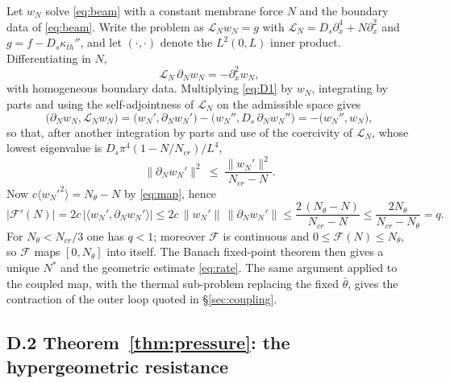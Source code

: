 \documentclass[11pt,a4paper]{article}
\begin{document}
Let $w_N$ solve \eqref{eq:beam} with a constant membrane force $N$ and the boundary data of
\eqref{eq:beam}. Write the problem as $\mathcal L_Nw_N=g$ with
$\mathcal L_N=D_s\partial_x^4+N\partial_x^2$ and $g=f-D_s\kappa_{th}''$, and let
$(\cdot,\cdot)$ denote the $L^2(0,L)$ inner product. Differentiating in $N$,
\begin{equation}
\mathcal L_N\,\partial_Nw_N=-\partial_x^2w_N ,
\label{eq:D1}
\end{equation}
with homogeneous boundary data. Multiplying \eqref{eq:D1} by $w_N$, integrating by parts and
using the self-adjointness of $\mathcal L_N$ on the admissible space gives
\begin{equation}
\bigl(\partial_Nw_N,\mathcal L_Nw_N\bigr)
=\bigl(w_N',\partial_Nw_N'\bigr)-\bigl(w_N'',D_s\,\partial_Nw_N''\bigr)
=-\bigl(w_N'',w_N\bigr),
\label{eq:D2}
\end{equation}
so that, after another integration by parts and use of the coercivity of $\mathcal L_N$,
whose lowest eigenvalue is $D_s\pi^4(1-N/N_{cr})/L^4$,
\begin{equation}
\bigl\|\partial_Nw_N'\bigr\|^2\ \le\ \frac{\|w_N'\|^2}{N_{cr}-N}.
\label{eq:D3}
\end{equation}
Now $c\langle w_N'^2\rangle=N_\theta-N$ by \eqref{eq:map}, hence
\begin{equation}
\bigl|\mathcal F'(N)\bigr|
=2c\,\bigl|\langle w_N',\partial_Nw_N'\rangle\bigr|
\le2c\,\|w_N'\|\,\|\partial_Nw_N'\|
\le\frac{2\,(N_\theta-N)}{N_{cr}-N}
\le\frac{2N_\theta}{N_{cr}-N_\theta}=q .
\label{eq:D4}
\end{equation}
For $N_\theta<N_{cr}/3$ one has $q<1$; moreover $\mathcal F$ is continuous and
$0\le\mathcal F(N)\le N_\theta$, so $\mathcal F$ maps $[0,N_\theta]$ into itself. The Banach
fixed-point theorem then gives a unique $N^*$ and the geometric estimate \eqref{eq:rate}. The
same argument applied to the coupled map, with the thermal sub-problem replacing the fixed
$\bar\theta$, gives the contraction of the outer loop quoted in \S\ref{sec:coupling}.

\subsection*{D.2 Theorem~\ref{thm:pressure}: the hypergeometric resistance}
\end{document}
